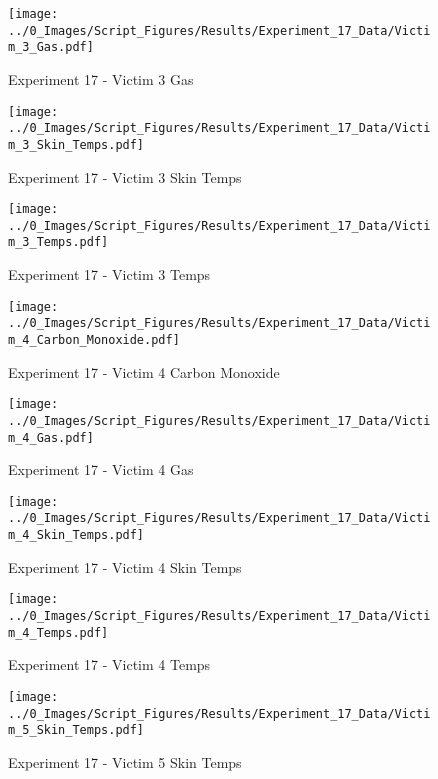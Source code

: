 	\clearpage

	\begin{figure}[H]
		\centering
		\texttt{[image: ../0\_Images/Script\_Figures/Results/Experiment\_17\_Data/Victim\_3\_Gas.pdf]}
		\caption[]{Experiment 17 - Victim 3 Gas}
	\end{figure}
 

	\begin{figure}[H]
		\centering
		\texttt{[image: ../0\_Images/Script\_Figures/Results/Experiment\_17\_Data/Victim\_3\_Skin\_Temps.pdf]}
		\caption[]{Experiment 17 - Victim 3 Skin Temps}
	\end{figure}
 
	\clearpage

	\begin{figure}[H]
		\centering
		\texttt{[image: ../0\_Images/Script\_Figures/Results/Experiment\_17\_Data/Victim\_3\_Temps.pdf]}
		\caption[]{Experiment 17 - Victim 3 Temps}
	\end{figure}
 

	\begin{figure}[H]
		\centering
		\texttt{[image: ../0\_Images/Script\_Figures/Results/Experiment\_17\_Data/Victim\_4\_Carbon\_Monoxide.pdf]}
		\caption[]{Experiment 17 - Victim 4 Carbon Monoxide}
	\end{figure}
 
	\clearpage

	\begin{figure}[H]
		\centering
		\texttt{[image: ../0\_Images/Script\_Figures/Results/Experiment\_17\_Data/Victim\_4\_Gas.pdf]}
		\caption[]{Experiment 17 - Victim 4 Gas}
	\end{figure}
 

	\begin{figure}[H]
		\centering
		\texttt{[image: ../0\_Images/Script\_Figures/Results/Experiment\_17\_Data/Victim\_4\_Skin\_Temps.pdf]}
		\caption[]{Experiment 17 - Victim 4 Skin Temps}
	\end{figure}
 
	\clearpage

	\begin{figure}[H]
		\centering
		\texttt{[image: ../0\_Images/Script\_Figures/Results/Experiment\_17\_Data/Victim\_4\_Temps.pdf]}
		\caption[]{Experiment 17 - Victim 4 Temps}
	\end{figure}
 

	\begin{figure}[H]
		\centering
		\texttt{[image: ../0\_Images/Script\_Figures/Results/Experiment\_17\_Data/Victim\_5\_Skin\_Temps.pdf]}
		\caption[]{Experiment 17 - Victim 5 Skin Temps}
	\end{figure}
 
